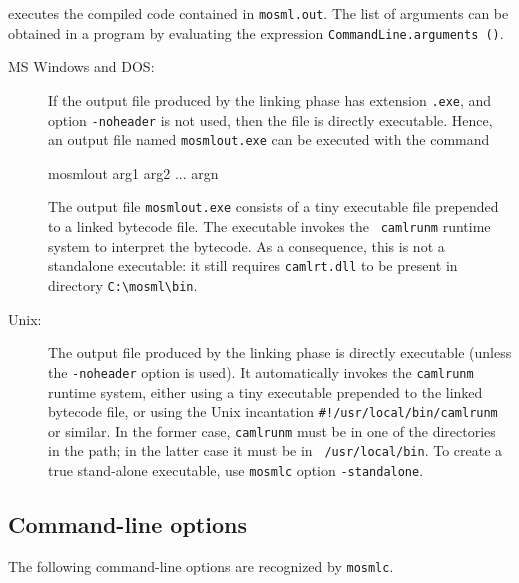 \documentclass[fleqn]{article}
\begin{document}
\noindent executes the compiled code contained in {\tt mosml.out}.
The list of arguments can be obtained in a program by evaluating the
expression {\tt CommandLine.arguments ()}.

\begin{description}
\item[MS Windows and DOS:] If the output file produced by the linking
  phase has extension {\tt .exe}, and option {\tt -noheader} is not
  used, then the file is directly executable.  Hence, an output file
  named {\tt mosmlout.exe} can be executed with the command

\begin{program}
mosmlout arg1 arg2 ... argn    
\end{program}

The output file {\tt mosmlout.exe} consists of a tiny executable file
prepended to a linked bytecode file.  The executable invokes the {\tt
  camlrunm} runtime system to interpret the bytecode.  As a
consequence, this is not a standalone executable: it still requires
{\tt camlrt.dll} to be present in directory \verb+C:\mosml\bin+.

\item[Unix:] The output file produced by the linking phase is directly
  executable (unless the {\tt -noheader} option is used).  It
  automatically invokes the {\tt camlrunm} runtime system, either
  using a tiny executable prepended to the linked bytecode file, or
  using the Unix incantation \verb|#!/usr/local/bin/camlrunm| or
  similar.  In the former case, {\tt camlrunm} must be in one of the
  directories in the path; in the latter case it must be in {\tt
    /usr/local/bin}.  To create a true stand-alone executable, use
  \texttt{mosmlc} option \texttt{-standalone}.
\end{description}


\subsection{Command-line options}
\label{sec-mosmlc-options}

The following command-line options are recognized by {\tt mosmlc}.
\end{document}
